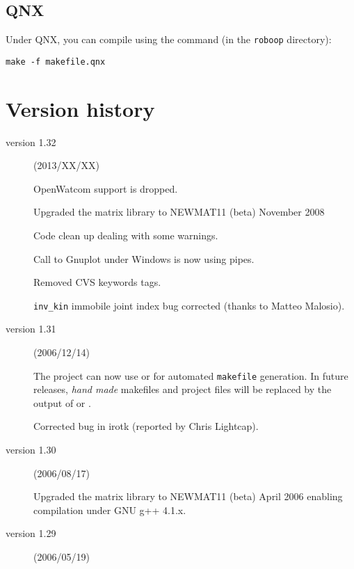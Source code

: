 \documentclass[11pt,fleqn,letterpaper]{report}
\begin{document}
\subsection{QNX}

Under \textsf{QNX}, you can compile using the command (in the
\texttt{roboop} directory):
\begin{verbatim}
make -f makefile.qnx
\end{verbatim}



\section{Version history}

\begin{description}

\item[version 1.32] (2013/XX/XX)

  \textsf{OpenWatcom} support is dropped.

  Upgraded the matrix library to \textsf{NEWMAT11 (beta) November
    2008}

  Code clean up dealing with some warnings.

  Call to \textsf{Gnuplot} under \textsf{Windows} is now using pipes.

  Removed \textsf{CVS} keywords tags.

  \texttt{inv\_kin} immobile joint index bug corrected (thanks to
  Matteo Malosio).

\item[version 1.31] (2006/12/14)
  
  The project can now use
   or
  for automated \texttt{makefile} generation. In future releases,
  \emph{hand made} makefiles and project files will be replaced by the
  output of 
  or
  .

  Corrected bug in irotk (reported by Chris Lightcap).
  
\item[version 1.30] (2006/08/17)
  
  Upgraded the matrix library to \textsf{NEWMAT11 (beta) April 2006}
  enabling compilation under \textsf{GNU g++ 4.1.x}.
  
\item[version 1.29] (2006/05/19)
  

\end{description}
\end{document}
